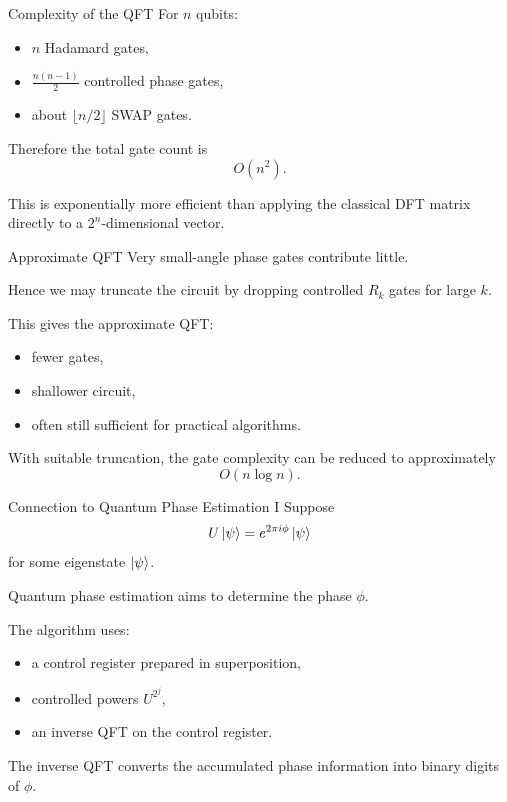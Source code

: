 \documentclass{beamer}
\begin{document}
\begin{frame}{Complexity of the QFT}
For \(n\) qubits:
\begin{itemize}
\item \(n\) Hadamard gates,
\item \(\frac{n(n-1)}{2}\) controlled phase gates,
\item about \(\lfloor n/2 \rfloor\) SWAP gates.
\end{itemize}

Therefore the total gate count is
\[
O(n^2).
\]

This is exponentially more efficient than applying the classical DFT matrix directly to a \(2^n\)-dimensional vector.
\end{frame}

\begin{frame}{Approximate QFT}
Very small-angle phase gates contribute little.

Hence we may truncate the circuit by dropping controlled \(R_k\) gates for large \(k\).

This gives the approximate QFT:
\begin{itemize}
\item fewer gates,
\item shallower circuit,
\item often still sufficient for practical algorithms.
\end{itemize}

With suitable truncation, the gate complexity can be reduced to approximately
\[
O(n \log n).
\]
\end{frame}

\begin{frame}{Connection to Quantum Phase Estimation I}
Suppose
\[
U \ket{\psi} = e^{2\pi i \phi}\ket{\psi}
\]
for some eigenstate \(\ket{\psi}\).

Quantum phase estimation aims to determine the phase \(\phi\).

The algorithm uses:
\begin{itemize}
\item a control register prepared in superposition,
\item controlled powers \(U^{2^j}\),
\item an inverse QFT on the control register.
\end{itemize}

The inverse QFT converts the accumulated phase information into binary digits of \(\phi\).
\end{frame}
\end{document}
